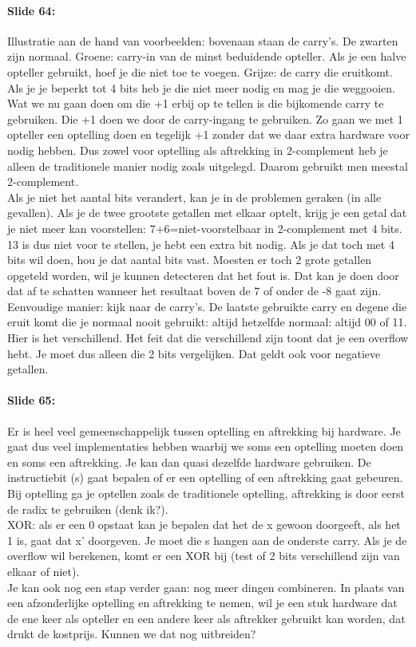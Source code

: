 \documentclass[10pt,a4paper]{book}
\begin{document}
\paragraph{Slide 64:} Illustratie aan de hand van voorbeelden: bovenaan staan de carry's. De zwarten zijn normaal. Groene: carry-in van de minst beduidende opteller. Als je een halve opteller gebruikt, hoef je die niet toe te voegen. Grijze: de carry die eruitkomt. Als je je beperkt tot 4 bits heb je die niet meer nodig en mag je die weggooien. Wat we nu gaan doen om die +1 erbij op te tellen is die bijkomende carry te gebruiken. Die +1 doen we door de carry-ingang te gebruiken. Zo gaan we met 1 opteller een optelling doen en tegelijk +1 zonder dat we daar extra hardware voor nodig hebben. Dus zowel voor optelling als aftrekking in 2-complement heb je alleen de traditionele manier nodig zoals uitgelegd. Daarom gebruikt men meestal 2-complement.\\
Als je niet het aantal bits verandert, kan je in de problemen geraken (in alle gevallen). Als je de twee grootste getallen met elkaar optelt, krijg je een getal dat je niet meer kan voorstellen: 7+6=niet-voorstelbaar in 2-complement met 4 bits. 13 is dus niet voor te stellen, je hebt een extra bit nodig. Als je dat toch met 4 bits wil doen, hou je dat aantal bits vast. Moesten er toch 2 grote getallen opgeteld worden, wil je kunnen detecteren dat het fout is. Dat kan je doen door dat af te schatten wanneer het resultaat boven de 7 of onder de -8 gaat zijn. Eenvoudige manier: kijk naar de carry's. De laatste gebruikte carry en degene die eruit komt die je normaal nooit gebruikt: altijd hetzelfde normaal: altijd 00 of 11. Hier is het verschillend. Het feit dat die verschillend zijn toont dat je een overflow hebt. Je moet dus alleen die 2 bits vergelijken. Dat geldt ook voor negatieve getallen.

\paragraph{Slide 65:} Er is heel veel gemeenschappelijk tussen optelling en aftrekking bij hardware. Je gaat dus veel implementaties hebben waarbij we soms een optelling moeten doen en soms een aftrekking. Je kan dan quasi dezelfde hardware gebruiken. De instructiebit (s) gaat bepalen of er een optelling of een aftrekking gaat gebeuren. Bij optelling ga je optellen zoals de traditionele optelling, aftrekking is door eerst de radix te gebruiken (denk ik?).\\
XOR: als er een 0 opstaat kan je bepalen dat het de x gewoon doorgeeft, als het 1 is, gaat dat x' doorgeven. Je moet die s hangen aan de onderste carry. Als je de overflow wil berekenen, komt er een XOR bij (test of 2 bits verschillend zijn van elkaar of niet).\\
Je kan ook nog een stap verder gaan: nog meer dingen combineren. In plaats van een afzonderlijke optelling en aftrekking te nemen, wil je een stuk hardware dat de ene keer als opteller en een andere keer als aftrekker gebruikt kan worden, dat drukt de kostprijs. Kunnen we dat nog uitbreiden? 
\end{document}
